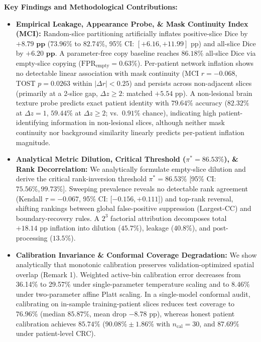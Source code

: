 \documentclass[10pt,a4paper]{article}
\begin{document}
\vspace{0.04em}
\noindent\textbf{Key Findings and Methodological Contributions:}
\begin{itemize}\setlength{\itemsep}{0pt}\setlength{\parsep}{0pt}\setlength{\parskip}{0pt}\setlength{\topsep}{1pt}\setlength{\partopsep}{0pt}\footnotesize
    \item \textbf{Empirical Leakage, Appearance Probe, \& Mask Continuity Index (MCI):} Random-slice partitioning artificially inflates positive-slice Dice by $\mathbf{+8.79\text{ pp}}$ ($73.96\%$ to $82.74\%$, 95\% CI: $[+6.16, +11.99]\text{ pp}$) and all-slice Dice by $\mathbf{+6.20\text{ pp}}$. A parameter-free copy baseline reaches $86.18\%$ all-slice Dice via empty-slice copying ($\text{FPR}_{\text{empty}} = 0.63\%$). Per-patient network inflation shows no detectable linear association with mask continuity ($\text{MCI } r = -0.068$, TOST $p = 0.0263$ within $|\Delta r| < 0.25$) and persists across non-adjacent slices (primarily at a 2-slice gap, $\Delta z \ge 2$: matched $+5.54\text{ pp}$). A non-lesional brain texture probe predicts exact patient identity with $79.64\%$ accuracy ($82.32\%$ at $\Delta z = 1$, $59.44\%$ at $\Delta z \ge 2$; vs.\ $0.91\%$ chance), indicating high patient-identifying information in non-lesional slices, although neither mask continuity nor background similarity linearly predicts per-patient inflation magnitude.
    \item \textbf{Analytical Metric Dilution, Critical Threshold ($\pi^* = 86.53\%$), \& Rank Decorrelation:} We analytically formulate empty-slice dilution and derive the critical rank-inversion threshold $\pi^*=86.53\%$ [95\% CI: $75.56\%, 99.73\%$]. Sweeping prevalence reveals no detectable rank agreement (Kendall $\tau = -0.067$, 95\% CI: [$-0.156, +0.111$]) and top-rank reversal, shifting rankings between global false-positive suppression (Largest-CC) and boundary-recovery rules. A $2^3$ factorial attribution decomposes total $+18.14\text{ pp}$ inflation into dilution ($45.7\%$), leakage ($40.8\%$), and post-processing ($13.5\%$).
    \item \textbf{Calibration Invariance \& Conformal Coverage Degradation:} We show analytically that monotonic calibration preserves validation-optimized spatial overlap (Remark 1). Weighted active-bin calibration error decreases from 36.14\% to 29.57\% under single-parameter temperature scaling and to 8.46\% under two-parameter affine Platt scaling. In a single-model conformal audit, calibrating on in-sample training-patient slices reduces test coverage to $76.96\%$ (median $85.87\%$, mean drop $-8.78\text{ pp}$), whereas honest patient calibration achieves $85.74\%$ ($90.08\% \pm 1.86\%$ with $n_{\text{cal}} = 30$, and $87.69\%$ under patient-level CRC).

\end{itemize}
\end{document}
